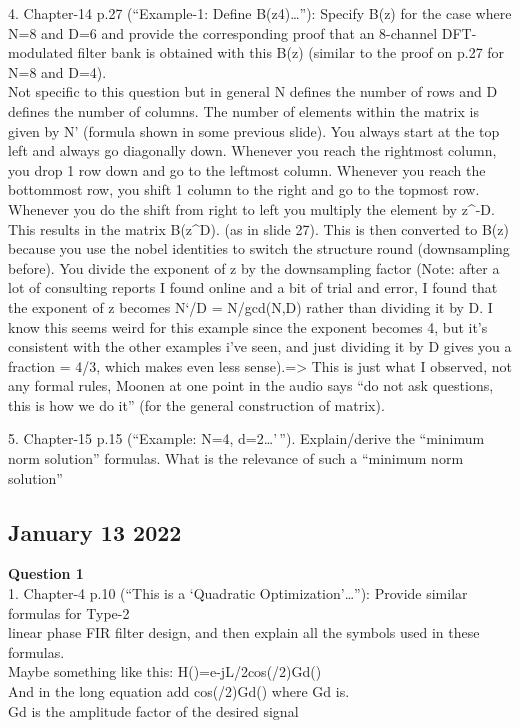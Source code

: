 \documentclass[
  a4paper,
  ,captions=tableheading
]{scrartcl}
\begin{document}
4. Chapter-14 p.27 (``Example-1: Define B(z4)\ldots''): Specify B(z) for
the case where N=8 and D=6 and provide the corresponding proof that an
8-channel DFT-modulated filter bank is obtained with this B(z) (similar
to the proof on p.27 for N=8 and D=4).\\
Not specific to this question but in general N defines the number of
rows and D defines the number of columns. The number of elements within
the matrix is given by N' (formula shown in some previous slide). You
always start at the top left and always go diagonally down. Whenever you
reach the rightmost column, you drop 1 row down and go to the leftmost
column. Whenever you reach the bottommost row, you shift 1 column to the
right and go to the topmost row. Whenever you do the shift from right to
left you multiply the element by z\^{}-D. This results in the matrix
B(z\^{}D). (as in slide 27). This is then converted to B(z) because you
use the nobel identities to switch the structure round (downsampling
before). You divide the exponent of z by the downsampling factor (Note:
after a lot of consulting reports I found online and a bit of trial and
error, I found that the exponent of z becomes N`/D = N/gcd(N,D) rather
than dividing it by D. I know this seems weird for this example since
the exponent becomes 4, but it's consistent with the other examples i've
seen, and just dividing it by D gives you a fraction = 4/3, which makes
even less sense).=\textgreater{} This is just what I observed, not any
formal rules, Moonen at one point in the audio says ``do not ask
questions, this is how we do it'' (for the general construction of
matrix).

5. Chapter-15 p.15 (``Example: N=4, d=2\ldots'\,''). Explain/derive the
``minimum norm solution'' formulas. What is the relevance of such a
``minimum norm solution''

\subsection{January 13 2022}\label{january-13-2022}

\textbf{Question 1}\\
1. Chapter-4 p.10 (``This is a `Quadratic Optimization'\ldots{}''):
Provide similar formulas for Type-2\\
linear phase FIR filter design, and then explain all the symbols used in
these formulas.\\
Maybe something like this: H()=e-jL/2cos(/2)Gd()\\
And in the long equation add cos(/2)Gd() where Gd is.\\
Gd is the amplitude factor of the desired signal
\end{document}
